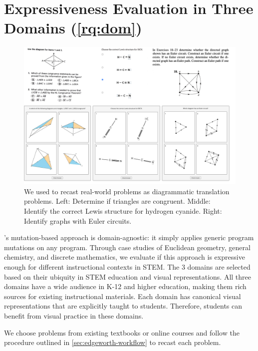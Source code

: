 \section{Expressiveness Evaluation in Three Domains (\ref{rq:dom})}
\label{sec:edgeworth-case-studies}

\begin{figure}[h]
    \centering
    \includegraphics[width=\linewidth]{assets/chapter-3/problem-samples.pdf}
    \caption{We used \Edgeworth to recast real-world problems as diagrammatic translation problems. Left: \textmd{Determine if triangles are congruent.}  Middle: \textmd{Identify the correct Lewis structure for hydrogen cyanide.} Right: \textmd{Identify graphs with Euler circuits.}}
    \label{fig:edgeworth-problems}
\end{figure}


\Edgeworth's mutation-based approach is domain-agnostic: it simply applies generic program mutations on any \Substance program. Through case studies of Euclidean geometry, general chemistry, and discrete mathematics, we evaluate if this approach is expressive enough for different instructional contexts in STEM. The 3 domains are selected based on their ubiquity in STEM education and visual representations. All three domains have a wide audience in K-12 and higher education, making them rich sources for existing instructional materials. Each domain has canonical visual representations that are explicitly taught to students. Therefore, students can benefit from visual practice in these domains.

We choose problems from existing textbooks or online courses and follow the procedure outlined in \cref{sec:edgeworth-workflow} to recast each problem. 

